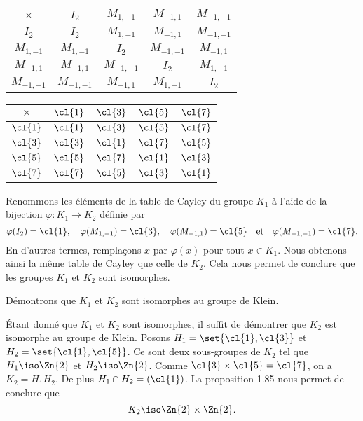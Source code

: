 \begin{enumerate}
    \begin{center}
      \begin{tabular}{c|cccc}
        $\times$    & $I_2$       & $M_{1,-1}$  & $M_{-1,1}$  & $M_{-1,-1}$ \\
        \midrule
        $I_2$       & $I_2$       & $M_{1,-1}$  & $M_{-1,1}$  & $M_{-1,-1}$ \\
        $M_{1,-1}$  & $M_{1,-1}$  & $I_2$       & $M_{-1,-1}$ & $M_{-1,1}$  \\
        $M_{-1,1}$  & $M_{-1,1}$  & $M_{-1,-1}$ & $I_2$       & $M_{1,-1}$  \\
        $M_{-1,-1}$ & $M_{-1,-1}$ & $M_{-1,1}$  & $M_{1,-1}$  & $I_2$
      \end{tabular}
    \end{center}
    \begin{center}
      \begin{tabular}{c|cccc}
        $\times$ & $\cl{1}$ & $\cl{3}$ & $\cl{5}$ & $\cl{7}$ \\
        \midrule
        $\cl{1}$ & $\cl{1}$ & $\cl{3}$ & $\cl{5}$ & $\cl{7}$ \\
        $\cl{3}$ & $\cl{3}$ & $\cl{1}$ & $\cl{7}$ & $\cl{5}$ \\
        $\cl{5}$ & $\cl{5}$ & $\cl{7}$ & $\cl{1}$ & $\cl{3}$ \\
        $\cl{7}$ & $\cl{7}$ & $\cl{5}$ & $\cl{3}$ & $\cl{1}$
      \end{tabular}
    \end{center}

    Renommons les éléments de la table de Cayley du groupe $K_1$ à l'aide de la
    bijection $\varphi\colon K_1\to K_2$ définie par
    \[
      \varphi(I_2) = \cl{1},\quad
      \varphi(M_{1,-1}) = \cl{3}, \quad
      \varphi(M_{-1,1}) = \cl{5} \quad\text{et}\quad
      \varphi(M_{-1,-1}) = \cl{7}.
    \]
    En d'autres termes, remplaçons $x$ par $\varphi(x)$ pour tout $x\in K_1$.
    Nous obtenons ainsi la même table de Cayley que celle de $K_2$. Cela nous
    permet de conclure que les groupes $K_1$ et $K_2$ sont isomorphes.

    Démontrons que $K_1$ et $K_2$ sont isomorphes au groupe de Klein.

    Étant donné que $K_1$ et $K_2$ sont isomorphes, il suffit de démontrer que
    $K_2$ est isomorphe au groupe de Klein.  Posons $H_1 = \set{\cl{1},\cl{3}}$
    et $H_2 = \set{\cl{1},\cl{5}}$. Ce sont deux sous-groupes de $K_2$ tel que
    $H_1\iso\Zn{2}$ et $H_2\iso\Zn{2}$.  Comme
    $\cl{3}\times\cl{5}=\cl{7}$, on a $K_2 = H_1H_2$.
    De plus $H_1\cap H_2 = (\cl{1})$. La proposition 1.85 nous permet de
    conclure que
    \[
      K_2\iso\Zn{2}\times\Zn{2}.
    \]
\end{enumerate}

